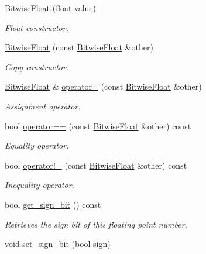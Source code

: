 \begin{DoxyCompactItemize}
\item 
\hyperlink{unionchaos_1_1data_1_1_bitwise_float_a7713ceaaa7cf2a487304088003d94135}{Bitwise\-Float} (float value)
\begin{DoxyCompactList}\small\item\em Float constructor. \end{DoxyCompactList}\item 
\hyperlink{unionchaos_1_1data_1_1_bitwise_float_a37070cb9a8ad9c96c709a2a08467ae77}{Bitwise\-Float} (const \hyperlink{unionchaos_1_1data_1_1_bitwise_float}{Bitwise\-Float} \&other)
\begin{DoxyCompactList}\small\item\em Copy constructor. \end{DoxyCompactList}\item 
\hyperlink{unionchaos_1_1data_1_1_bitwise_float}{Bitwise\-Float} \& \hyperlink{unionchaos_1_1data_1_1_bitwise_float_a2d2fdb0bfa06452e43184cb9a1db30f7}{operator=} (const \hyperlink{unionchaos_1_1data_1_1_bitwise_float}{Bitwise\-Float} \&other)
\begin{DoxyCompactList}\small\item\em Assignment operator. \end{DoxyCompactList}\item 
bool \hyperlink{unionchaos_1_1data_1_1_bitwise_float_a8c9504d5df1069a3b7af9bb1986dcab3}{operator==} (const \hyperlink{unionchaos_1_1data_1_1_bitwise_float}{Bitwise\-Float} \&other) const 
\begin{DoxyCompactList}\small\item\em Equality operator. \end{DoxyCompactList}\item 
bool \hyperlink{unionchaos_1_1data_1_1_bitwise_float_a103eeef1d692951938c2f269ea0accf3}{operator!=} (const \hyperlink{unionchaos_1_1data_1_1_bitwise_float}{Bitwise\-Float} \&other) const 
\begin{DoxyCompactList}\small\item\em Inequality operator. \end{DoxyCompactList}\item 
\hypertarget{unionchaos_1_1data_1_1_bitwise_float_aec1ad0a94dcf984131cc528b574c7d2d}{bool \hyperlink{unionchaos_1_1data_1_1_bitwise_float_aec1ad0a94dcf984131cc528b574c7d2d}{get\-\_\-sign\-\_\-bit} () const }\label{unionchaos_1_1data_1_1_bitwise_float_aec1ad0a94dcf984131cc528b574c7d2d}

\begin{DoxyCompactList}\small\item\em Retrieves the sign bit of this floating point number. \end{DoxyCompactList}\item 
\hypertarget{unionchaos_1_1data_1_1_bitwise_float_a53663822515d674b2fbcad78a758559c}{void \hyperlink{unionchaos_1_1data_1_1_bitwise_float_a53663822515d674b2fbcad78a758559c}{set\-\_\-sign\-\_\-bit} (bool sign)}\label{unionchaos_1_1data_1_1_bitwise_float_a53663822515d674b2fbcad78a758559c}


\end{DoxyCompactItemize}
